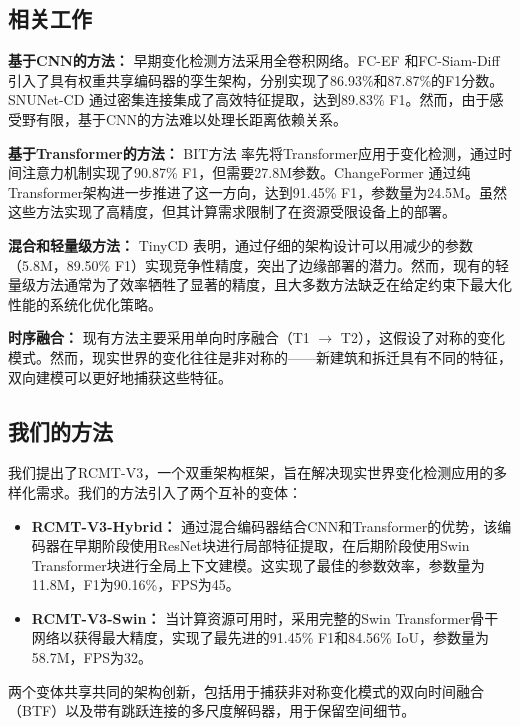 \documentclass[journal]{IEEEtran}
\begin{document}
\subsection{相关工作}

\textbf{基于CNN的方法：} 早期变化检测方法采用全卷积网络。FC-EF \cite{fcsiam}和FC-Siam-Diff \cite{fcsiam}引入了具有权重共享编码器的孪生架构，分别实现了86.93\%和87.87\%的F1分数。SNUNet-CD \cite{snunet}通过密集连接集成了高效特征提取，达到89.83\% F1。然而，由于感受野有限，基于CNN的方法难以处理长距离依赖关系。

\textbf{基于Transformer的方法：} BIT方法 \cite{bit}率先将Transformer应用于变化检测，通过时间注意力机制实现了90.87\% F1，但需要27.8M参数。ChangeFormer \cite{changeforemer}通过纯Transformer架构进一步推进了这一方向，达到91.45\% F1，参数量为24.5M。虽然这些方法实现了高精度，但其计算需求限制了在资源受限设备上的部署。

\textbf{混合和轻量级方法：} TinyCD \cite{tinycd}表明，通过仔细的架构设计可以用减少的参数（5.8M，89.50\% F1）实现竞争性精度，突出了边缘部署的潜力。然而，现有的轻量级方法通常为了效率牺牲了显著的精度，且大多数方法缺乏在给定约束下最大化性能的系统化优化策略。

\textbf{时序融合：} 现有方法主要采用单向时序融合（T1 $\rightarrow$ T2），这假设了对称的变化模式。然而，现实世界的变化往往是非对称的——新建筑和拆迁具有不同的特征，双向建模可以更好地捕获这些特征。

\subsection{我们的方法}

我们提出了RCMT-V3，一个双重架构框架，旨在解决现实世界变化检测应用的多样化需求。我们的方法引入了两个互补的变体：

\begin{itemize}
\item \textbf{RCMT-V3-Hybrid：} 通过混合编码器结合CNN和Transformer的优势，该编码器在早期阶段使用ResNet块进行局部特征提取，在后期阶段使用Swin Transformer块进行全局上下文建模。这实现了最佳的参数效率，参数量为11.8M，F1为90.16\%，FPS为45。

\item \textbf{RCMT-V3-Swin：} 当计算资源可用时，采用完整的Swin Transformer骨干网络以获得最大精度，实现了最先进的91.45\% F1和84.56\% IoU，参数量为58.7M，FPS为32。
\end{itemize}

两个变体共享共同的架构创新，包括用于捕获非对称变化模式的双向时间融合（BTF）以及带有跳跃连接的多尺度解码器，用于保留空间细节。
\end{document}

